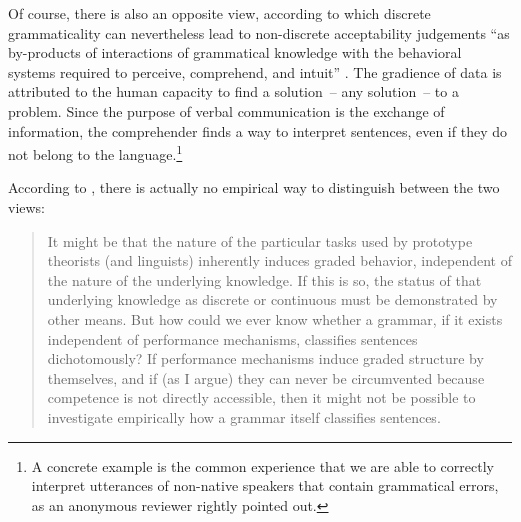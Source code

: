 Of course, there is also an opposite view, according to which discrete grammaticality can nevertheless lead to non-discrete acceptability judgements ``as by-products of interactions of grammatical knowledge with the behavioral systems required to perceive, comprehend, and intuit'' \citep[871--872]{Carroll.1979}. The gradience of data is attributed to the human capacity to find a solution~-- any solution~-- to a problem. Since the purpose of verbal communication is the exchange of information, the comprehender finds a way to interpret sentences, even if they do not belong to the language.\footnote{A concrete example is the common experience that we are able to correctly interpret utterances of non-native speakers that contain grammatical errors, as an anonymous reviewer rightly pointed out.} 

According to \citet{Schutze.2016.ex1996}, there is actually no empirical way to distinguish between the two views:

\begin{quote}
    It might be that the nature of the particular tasks used by prototype theorists
(and linguists) inherently induces graded behavior, independent of the nature of
the underlying knowledge. If this is so, the status of that underlying knowledge
as discrete or continuous must be demonstrated by other means. But how could
we ever know whether a grammar, if it exists independent of performance mechanisms, classifies sentences dichotomously? If performance mechanisms induce
graded structure by themselves, and if (as I argue) they can never be circumvented because competence is not directly accessible, then it might not be possible to investigate empirically how a grammar itself classifies sentences. \citep[69]{Schutze.2016.ex1996}
\end{quote}

